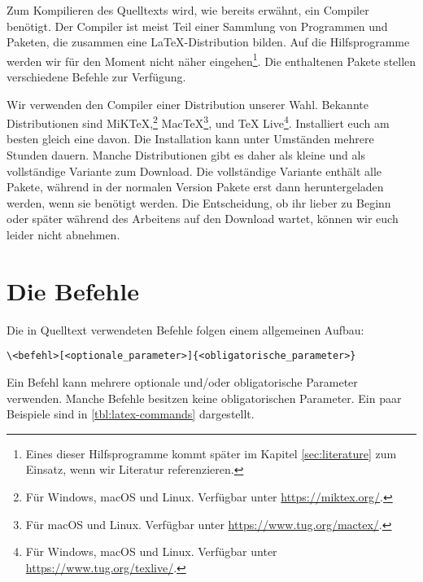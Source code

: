 Zum Kompilieren des Quelltexts wird, wie bereits erwähnt, ein Compiler benötigt.
Der Compiler ist meist Teil einer Sammlung von Programmen und Paketen, die zusammen eine \LaTeX-Distribution bilden. 
Auf die Hilfsprogramme werden wir für den Moment nicht näher eingehen\footnote{Eines dieser Hilfsprogramme kommt später im Kapitel \ref{sec:literature} zum Einsatz, wenn wir Literatur referenzieren.}. Die enthaltenen Pakete stellen verschiedene Befehle zur Verfügung.

Wir verwenden den Compiler einer Distribution unserer Wahl. Bekannte Distributionen sind MiK\TeX,\footnote{Für Windows, macOS und Linux. Verfügbar unter \url{https://miktex.org/}.} Mac\TeX\footnote{Für macOS und Linux. Verfügbar unter \url{https://www.tug.org/mactex/}.}, und \TeX{} Live\footnote{Für Windows, macOS und Linux. Verfügbar unter \url{https://www.tug.org/texlive/}.}.
Installiert euch am besten gleich eine davon. Die Installation kann unter Umständen mehrere Stunden dauern. Manche Distributionen gibt es daher als kleine und als vollständige Variante zum Download. 
Die vollständige Variante enthält alle Pakete, während in der normalen Version Pakete erst dann heruntergeladen werden, wenn sie benötigt werden.
Die Entscheidung, ob ihr lieber zu Beginn oder später während des Arbeitens auf den Download wartet, können wir euch leider nicht abnehmen. 

\section{Die Befehle}
\label{subsec:command-structure}
Die in Quelltext verwendeten Befehle folgen einem allgemeinen Aufbau:
\begin{verbatim}
\<befehl>[<optionale_parameter>]{<obligatorische_parameter>}
\end{verbatim}
Ein Befehl kann mehrere optionale und/oder obligatorische Parameter verwenden. Manche Befehle besitzen keine obligatorischen Parameter. Ein paar Beispiele sind in \cref{tbl:latex-commands} dargestellt.

\begin{table}[h!]
	\caption{Beispiele für \LaTeX-Befehle}
	\label{tbl:latex-commands}
\end{table}

